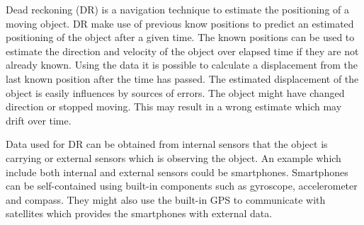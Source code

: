 Dead reckoning (DR) \cite{DR} is a navigation technique to estimate the positioning of a moving object.
DR make use of previous know positions to predict an estimated positioning of the object after a given time.
The known positions can be used to estimate the direction and velocity of the object over elapsed time if they are not already known.
Using the data it is possible to calculate a displacement from the last known position after the time has passed.
The estimated displacement of the object is easily influences by sources of errors.
The object might have changed direction or stopped moving.
This may result in a wrong estimate which may drift over time.

Data used for DR can be obtained from internal sensors that the object is carrying or external sensors which is observing the object.
An example which include both internal and external sensors could be smartphones.
Smartphones can be self-contained using built-in components such as gyroscope, accelerometer and compass.
They might also use the built-in GPS to communicate with satellites which provides the smartphones with external data.